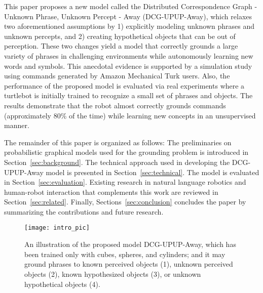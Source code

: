This paper proposes a new model called the Distributed Correspondence Graph - Unknown Phrase, Unknown Percept - Away (DCG-UPUP-Away), which relaxes two aforementioned assumptions by 1) explicitly modeling unknown phrases and unknown percepts, and 2) creating hypothetical objects that can be out of perception.
These two changes yield a model that correctly grounds a large variety of phrases in challenging environments while autonomously learning new words and symbols.
This anecdotal evidence is supported by a simulation study using commands generated by Amazon Mechanical Turk users.
Also, the performance of the proposed model is evaluated via real experiments where a turtlebot is initially trained to recognize a small set of phrases and objects. The results demonstrate that the robot almost correctly grounds commands (approximately 80\% of the time) while learning new concepts in an unsupervised manner.

The remainder of this paper is organized as follows:
The preliminaries on probabilistic graphical models used for the grounding problem is introduced in Section~\ref{sec:background}.
The technical approach used in developing the DCG-UPUP-Away model is presented in Section~\ref{sec:technical}.
The model is evaluated in Section~\ref{sec:evaluation}.
Existing research in natural language robotics and human-robot interaction that complements this work are reviewed in Section~\ref{sec:related}. Finally, Sections~\ref{sec:conclusion} concludes the paper by summarizing the contributions and future research.
\begin{figure}[t]
	\centering
	\texttt{[image: intro\_pic]}
	\caption{An illustration of the proposed model DCG-UPUP-Away, which has been trained only with cubes, spheres, and cylinders; and it may ground phrases to known perceived objects (1), unknown perceived objects (2), known hypothesized objects (3), or unknown hypothetical objects (4).}
	\label{fig:intro_pic}
\end{figure}